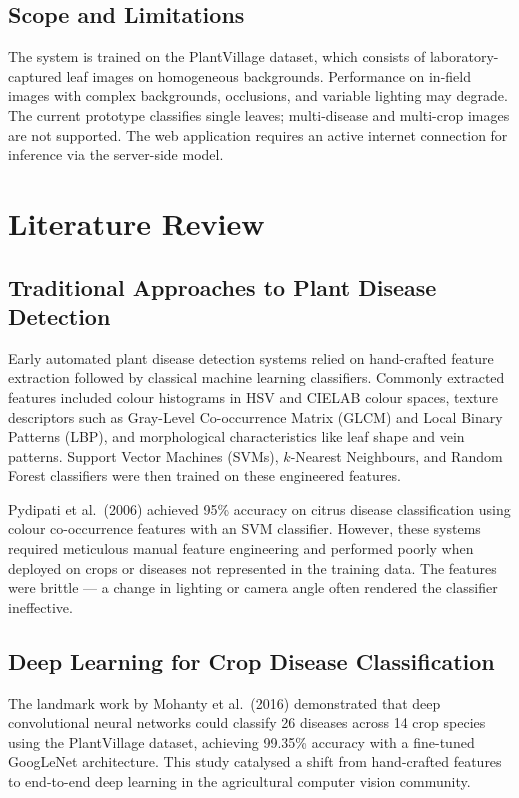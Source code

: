 \documentclass[11pt,a4paper]{article}
\newcommand{\parsp}{\medskip}
\begin{document}
\subsection{Scope and Limitations}

The system is trained on the PlantVillage dataset, which consists of
laboratory-captured leaf images on homogeneous backgrounds. Performance on
in-field images with complex backgrounds, occlusions, and variable lighting
may degrade. The current prototype classifies single leaves; multi-disease
and multi-crop images are not supported. The web application requires an
active internet connection for inference via the server-side model.

\section{Literature Review}

\subsection{Traditional Approaches to Plant Disease Detection}

Early automated plant disease detection systems relied on hand-crafted
feature extraction followed by classical machine learning classifiers.
Commonly extracted features included colour histograms in HSV and CIELAB
colour spaces, texture descriptors such as Gray-Level Co-occurrence Matrix
(GLCM) and Local Binary Patterns (LBP), and morphological characteristics
like leaf shape and vein patterns. Support Vector Machines (SVMs),
$k$-Nearest Neighbours, and Random Forest classifiers were then trained on
these engineered features.

\parsp
Pydipati et al.\ (2006) achieved 95\% accuracy on citrus disease
classification using colour co-occurrence features with an SVM classifier.
However, these systems required meticulous manual feature engineering and
performed poorly when deployed on crops or diseases not represented in the
training data. The features were brittle — a change in lighting or camera
angle often rendered the classifier ineffective.

\subsection{Deep Learning for Crop Disease Classification}

The landmark work by Mohanty et al.\ (2016) demonstrated that deep
convolutional neural networks could classify 26 diseases across 14 crop
species using the PlantVillage dataset, achieving 99.35\% accuracy with a
fine-tuned GoogLeNet architecture. This study catalysed a shift from
hand-crafted features to end-to-end deep learning in the agricultural
computer vision community.
\end{document}
